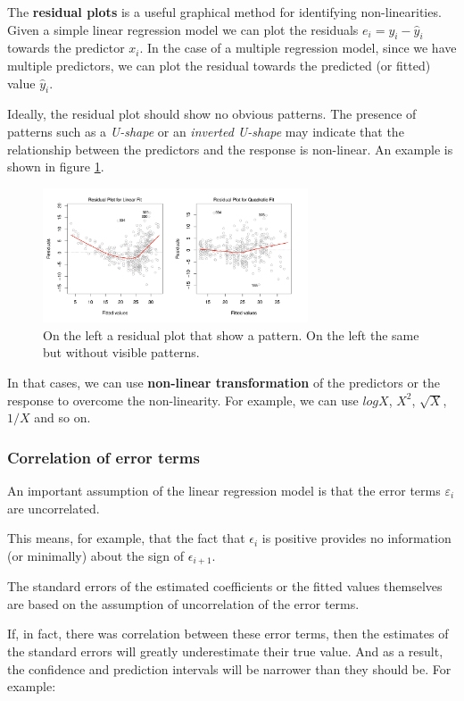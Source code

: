 The \textbf{residual plots} is a useful graphical method for identifying non-linearities.
Given a simple linear regression model we can plot the residuals $e_i=y_i-\hat y_i$ towards the predictor $x_i$.
In the case of a multiple regression model, since we have multiple predictors, we can plot the residual towards the predicted (or fitted) value $\hat y_i$.

Ideally, the residual plot should show no obvious patterns.
The presence of patterns such as a \textit{U-shape} or an \textit{inverted U-shape} may indicate that the relationship between the predictors and the response is non-linear.
An example is shown in figure \ref{fig:residuals_example}.
\begin{figure}
    \centering
    \includegraphics[width=0.7\textwidth]{./figures/chapter_3/residuals_example.png}
    \caption{On the left a residual plot that show a pattern. On the left the same but without visible patterns.}
    \label{fig:residuals_example}
\end{figure}

In that cases, we can use \textbf{non-linear transformation} of the predictors or the response to overcome the non-linearity. For example, we can use $log X$, $X^2$, $\sqrt{X}$, $1/X$ and so on.
\subsubsection*{Correlation of error terms}
An important assumption of the linear regression model is that the error terms $\varepsilon_i$ are uncorrelated.

This means, for example, that the fact that $\epsilon_i$ is positive provides no information (or minimally) about the sign of $\epsilon_{i+1}$.

The standard errors of the estimated coefficients or the fitted values themselves are based on the assumption of uncorrelation of the error terms.

If, in fact, there was correlation between these error terms, then the estimates of the standard errors will greatly underestimate their true value. And as a result, the confidence and prediction intervals will be narrower than they should be. For example:

